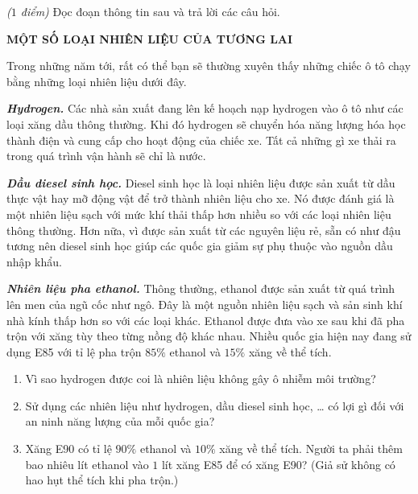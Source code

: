\documentclass[Main.tex]{subfiles}
\begin{document}
\begin{bt}%
	\textit{($1$ điểm)} Đọc đoạn thông tin sau và trả lời các câu hỏi.
	\begin{center}
		\textbf{MỘT SỐ LOẠI NHIÊN LIỆU CỦA TƯƠNG LAI}
	\end{center}
	Trong những năm tới, rất có thể bạn sẽ thường xuyên thấy những chiếc ô tô chạy bằng những loại nhiên liệu dưới đây.

	\textbf{\textit{Hydrogen.}} Các nhà sản xuất đang lên kế hoạch nạp hydrogen vào ô tô như các loại xăng dầu thông thường. Khi đó hydrogen sẽ chuyển hóa năng lượng hóa học thành điện và cung cấp cho hoạt động của chiếc xe. Tất cả những gì xe thải ra trong quá trình vận hành sẽ chỉ là nước.

	\textbf{\textit{Dầu diesel sinh học.}} Diesel sinh học là loại nhiên liệu được sản xuất từ dầu thực vật hay mỡ động vật để trở thành nhiên liệu cho xe. Nó được đánh giá là một nhiên liệu sạch với mức khí thải thấp hơn nhiều so với các loại nhiên liệu thông thường. Hơn nữa, vì được sản xuất từ các nguyên liệu rẻ, sẵn có như đậu tương nên diesel sinh học giúp các quốc gia giảm sự phụ thuộc vào nguồn dầu nhập khẩu.

	\textbf{\textit{Nhiên liệu pha ethanol.}} Thông thường, ethanol được sản xuất từ quá trình lên men của ngũ cốc như ngô. Đây là một nguồn nhiên liệu sạch và sản sinh khí nhà kính thấp hơn so với các loại khác. Ethanol được đưa vào xe sau khi đã pha trộn với xăng tùy theo từng nồng độ khác nhau. Nhiều quốc gia hiện nay đang sử dụng E85 với tỉ lệ pha trộn $85\%$ ethanol và $15\%$ xăng về thể tích.
	\begin{enumerate}
		\item[(a)] Vì sao hydrogen được coi là nhiên liệu không gây ô nhiễm môi trường?
		\item[(b)] Sử dụng các nhiên liệu như hydrogen, dầu diesel sinh học, … có lợi gì đối với an ninh năng lượng của mỗi quốc gia?
		\item[(c)] Xăng E90 có tỉ lệ $90\%$ ethanol và $10\%$ xăng về thể tích. Người ta phải thêm bao nhiêu lít ethanol vào $1$ lít xăng E85 để có xăng E90? (Giả sử không có hao hụt thể tích khi pha trộn.)
	\end{enumerate}
\end{bt}
\end{document}
